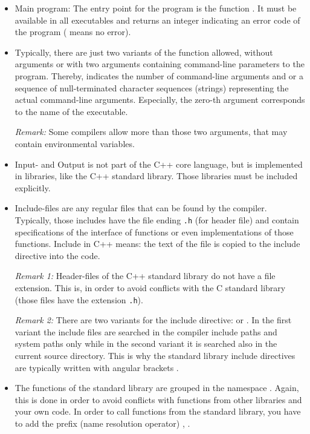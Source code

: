\begin{itemize}
  \item Main program: The entry point for the program is the function . It must be available in all executables and returns an integer indicating an error code of the program ( means no error).

  \item Typically, there are just two variants of the  function allowed, without arguments or with two arguments containing command-line parameters to the program. Thereby,  indicates the number of command-line arguments and  or  a sequence of null-terminated character sequences (strings) representing the actual command-line arguments. Especially, the zero-th argument  corresponds to the name of the executable.

  \textit{Remark:} Some compilers allow more than those two arguments, that may contain environmental variables.

  \item Input- and Output is not part of the C++ core language, but is implemented in libraries, like the C++ standard library. Those libraries must be included explicitly.

  \item Include-files are any regular files that can be found by the compiler. Typically, those includes have the file ending \texttt{.h} (for header file) and contain specifications of the interface of functions or even implementations of those functions. Include in C++ means: the text of the file is copied to the include directive  into the code.

  \textit{Remark 1:} Header-files of the C++ standard library do not have a file extension. This is, in order to avoid conflicts with the C standard library (those files have the extension \texttt{.h}).

  \textit{Remark 2:} There are two variants for the include directive:  or . In the first variant the include files are searched in the compiler include paths and system paths only while in the second variant it is searched also in the current source directory. This is why the standard library include directives are typically written with angular brackets .

  \item The functions of the standard library are grouped in the namespace . Again, this is done in order to avoid conflicts with functions from other libraries and your own code. In order to call functions from the standard library, you have to add the prefix (name resolution operator) \cpp{::}, \eg {}.


\end{itemize}
